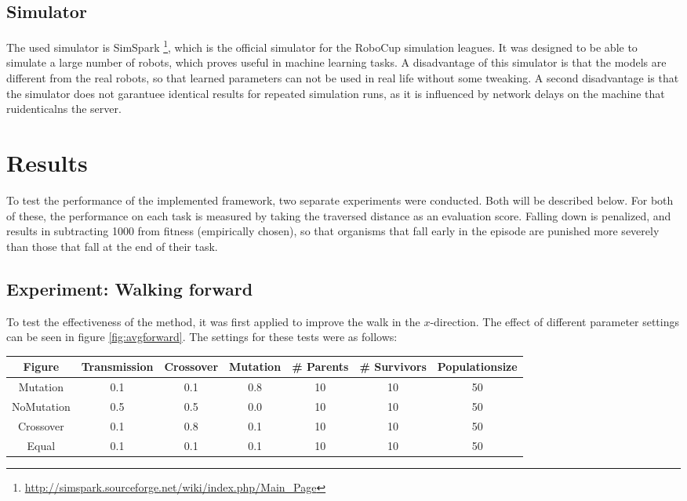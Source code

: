 \documentclass{article}
\begin{document}
\subsection{Simulator}
The used simulator is SimSpark \footnote{\url{http://simspark.sourceforge.net/wiki/index.php/Main_Page}}, which is the official simulator for the RoboCup simulation leagues. It was designed to be able to simulate a large number of robots, which proves useful in machine learning tasks. A disadvantage of this simulator is that the models are 
different from the real robots, so that learned parameters can not be used in real life without some tweaking. A second disadvantage is that the simulator does not garantuee identical results for repeated simulation runs, as it is influenced by network delays on the machine that ruidenticalns the server. 

\section{Results}
To test the performance of the implemented framework, two separate experiments were conducted. Both will be described below. For both of these, the performance on each task is measured by taking the traversed distance as an evaluation score. Falling down is penalized, and results in subtracting 1000 from fitness (empirically chosen), so that organisms that fall early in the episode are punished more severely than those that fall at the end of their task.

\subsection{Experiment: Walking forward}
To test the effectiveness of the method, it was first applied to improve the walk in the $x$-direction. The effect of different parameter settings can be seen in figure \ref{fig:avgforward}. The settings for these tests were as follows:

\vspace{4mm}
\begin{tabular}{c | c          c           c           c         c             c  }
 Figure      &  Transmission & Crossover & Mutation & \# Parents & \# Survivors & Populationsize \\
 \hline
 Mutation    &  0.1              & 0.1           & 0.8          &  10  & 10  & 50  \\ 
 NoMutation  &  0.5              & 0.5           & 0.0          &  10  & 10  & 50  \\
 Crossover   &  0.1              & 0.8           & 0.1          &  10  & 10  & 50  \\
 Equal       &  0.1              & 0.1           & 0.1          &  10  & 10  & 50  \\
\end{tabular}
\vspace{4mm}
\end{document}

